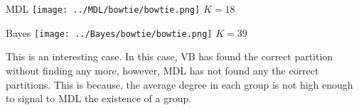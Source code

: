 \begin{minipage}{0.45\linewidth}
MDL
\centering
\texttt{[image: ../MDL/bowtie/bowtie.png]}
$K=18$

\end{minipage}
\begin{minipage}{0.45\linewidth}
Bayes
\centering
\texttt{[image: ../Bayes/bowtie/bowtie.png]}
$K=39$
\end{minipage}
\vspace{10pt}

This is an interesting case. In this case, VB has found the correct
partition without finding any more, however, MDL has not found any
the correct partitions. This is because, the average degree in each
group is not high enough to signal to MDL the existence of a group.

